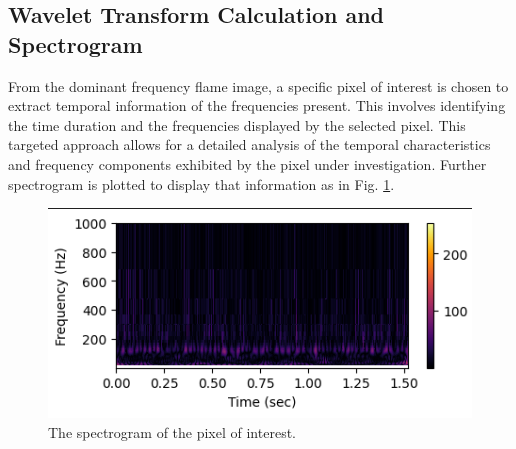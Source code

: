 \documentclass[conference]{IEEEtran}
\begin{document}
\subsection{Wavelet Transform Calculation and Spectrogram}

From the dominant frequency flame image, a specific pixel of interest is chosen to extract temporal information of the frequencies present. This involves identifying the time duration and the frequencies displayed by the selected pixel. This targeted approach allows for a detailed analysis of the temporal characteristics and frequency components exhibited by the pixel under investigation. Further spectrogram is plotted to display that information as in Fig. \ref{fig:k7}.

		\begin{figure}[H]
	\includegraphics[scale=.51]{plot/spect.png}
	\caption{The spectrogram of the pixel of interest.}\label{fig:k7}
\end{figure}
\end{document}
